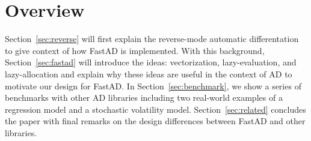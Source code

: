 \section{Overview}

Section~\ref{sec:reverse} will first explain the reverse-mode automatic differentation
to give context of how FastAD is implemented.
With this background, Section~\ref{sec:fastad} will introduce the ideas:
vectorization, lazy-evaluation, and lazy-allocation and explain why these
ideas are useful in the context of AD to motivate our design for FastAD.
In Section~\ref{sec:benchmark}, we show a series of benchmarks with
other AD libraries including two real-world examples 
of a regression model and a stochastic volatility model.
Section~\ref{sec:related} concludes the paper with final remarks on
the design differences between FastAD and other libraries.
